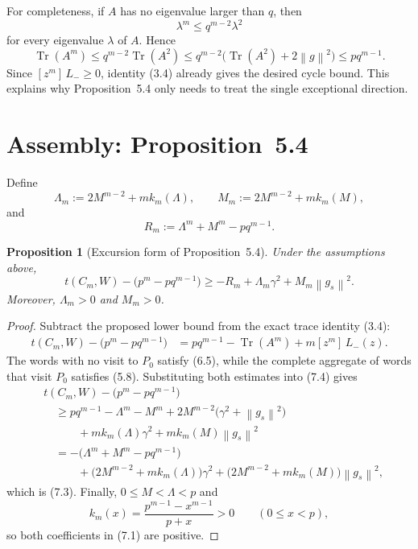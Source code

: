 \documentclass[11pt]{article}
\newtheorem{proposition}{Proposition}
\newcommand{\Tr}{\operatorname{Tr}}
\newcommand{\norm}[1]{\left\lVert #1\right\rVert}
\newcommand{\coeff}[2]{[z^{#1}]\,#2}
\begin{document}
For completeness, if $A$ has no eigenvalue larger than $q$, then
\[
  \lambda^m\leq q^{m-2}\lambda^2
\]
for every eigenvalue $\lambda$ of $A$.  Hence
\[
  \Tr(A^m)
  \leq q^{m-2}\Tr(A^2)
  \leq q^{m-2}\bigl(\Tr(A^2)+2\norm{g}^2\bigr)
  \leq pq^{m-1}.
  \tag{6.6}
\]
Since $\coeff{m}{L_-}\geq0$, identity (3.4) already gives the desired cycle
bound.  This explains why Proposition~5.4 only needs to treat the single
exceptional direction.

\section{Assembly: Proposition~5.4}

Define
\[
  \Lambda_m:=2M^{m-2}+mk_m(\Lambda),
  \qquad
  M_m:=2M^{m-2}+mk_m(M),
  \tag{7.1}
\]
and
\[
  R_m:=\Lambda^m+M^m-pq^{m-1}.
  \tag{7.2}
\]

\begin{proposition}[Excursion form of Proposition~5.4]
Under the assumptions above,
\[
\boxed{
  t(C_m,W)-\bigl(p^m-pq^{m-1}\bigr)
  \geq
  -R_m+\Lambda_m\gamma^2+M_m\norm{g_s}^2.
}
  \tag{7.3}
\]
Moreover, $\Lambda_m>0$ and $M_m>0$.
\end{proposition}

\begin{proof}
Subtract the proposed lower bound from the exact trace identity (3.4):
\begin{equation}
\begin{aligned}
  t(C_m,W)-\bigl(p^m-pq^{m-1}\bigr)
  &=pq^{m-1}-\Tr(A^m)+m\coeff{m}{L_-(z)}.
\end{aligned}
  \tag{7.4}
\end{equation}
The words with no visit to $P_0$ satisfy (6.5), while the complete aggregate
of words that visit $P_0$ satisfies (5.8).  Substituting both estimates into
(7.4) gives
\[
\begin{aligned}
  &t(C_m,W)-\bigl(p^m-pq^{m-1}\bigr)\\
  &\quad\geq
  pq^{m-1}-\Lambda^m-M^m
  +2M^{m-2}\bigl(\gamma^2+\norm{g_s}^2\bigr)\\
  &\qquad\quad
  +mk_m(\Lambda)\gamma^2
  +mk_m(M)\norm{g_s}^2\\
  &\quad=
  -\bigl(\Lambda^m+M^m-pq^{m-1}\bigr)\\
  &\qquad\quad
  +\bigl(2M^{m-2}+mk_m(\Lambda)\bigr)\gamma^2
  +\bigl(2M^{m-2}+mk_m(M)\bigr)\norm{g_s}^2,
\end{aligned}
\]
which is (7.3).  Finally, $0\leq M<\Lambda<p$ and
\[
  k_m(x)=\frac{p^{m-1}-x^{m-1}}{p+x}>0
  \qquad(0\leq x<p),
\]
so both coefficients in (7.1) are positive.
\end{proof}
\end{document}

